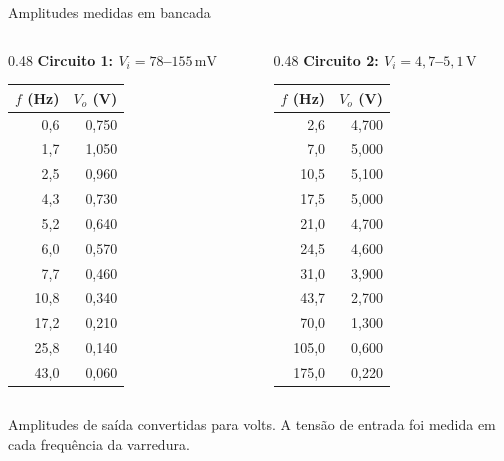 \begin{frame}{Amplitudes medidas em bancada}
  \small
  \renewcommand{\arraystretch}{0.93}
  \begin{columns}[T,onlytextwidth]
    \begin{column}{0.48\textwidth}
      \centering
      \textbf{Circuito 1: $V_i=78$--$155\,\mathrm{mV}$}

      \vspace{0.10cm}
      \begin{tabular}{rr}
        \toprule
        $f$ (Hz) & $V_o$ (V) \\
        \midrule
        0,6 & 0,750 \\
        1,7 & 1,050 \\
        2,5 & 0,960 \\
        4,3 & 0,730 \\
        5,2 & 0,640 \\
        6,0 & 0,570 \\
        7,7 & 0,460 \\
        10,8 & 0,340 \\
        17,2 & 0,210 \\
        25,8 & 0,140 \\
        43,0 & 0,060 \\
        \bottomrule
      \end{tabular}
    \end{column}
    \begin{column}{0.48\textwidth}
      \centering
      \textbf{Circuito 2: $V_i=4{,}7$--$5{,}1\,\mathrm{V}$}

      \vspace{0.10cm}
      \begin{tabular}{rr}
        \toprule
        $f$ (Hz) & $V_o$ (V) \\
        \midrule
        2,6 & 4,700 \\
        7,0 & 5,000 \\
        10,5 & 5,100 \\
        17,5 & 5,000 \\
        21,0 & 4,700 \\
        24,5 & 4,600 \\
        31,0 & 3,900 \\
        43,7 & 2,700 \\
        70,0 & 1,300 \\
        105,0 & 0,600 \\
        175,0 & 0,220 \\
        \bottomrule
      \end{tabular}
    \end{column}
  \end{columns}

  \vspace{0.14cm}
  \centering\scriptsize
  Amplitudes de saída convertidas para volts.
  A tensão de entrada foi medida em cada frequência da varredura.
\end{frame}
